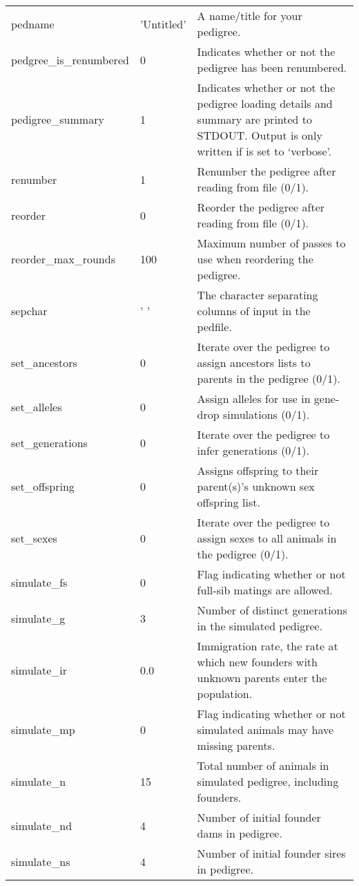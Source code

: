 \begin{center}
\begin{xtabular}{l|l|p{4in}}
	pedname          & 'Untitled'   & A name/title for your pedigree. \\
	pedgree\_is\_renumbered & 0     & Indicates whether or not the pedigree has been renumbered. \\
	pedigree\_summary & 1           & Indicates whether or not the pedigree loading details and summary are printed to STDOUT.  Output is only written if  is set to `verbose'. \\
	renumber         & 1            & Renumber the pedigree after reading from file (0/1). \\
	reorder 	 & 0		& Reorder the pedigree after reading from file (0/1). \\
	reorder\_max\_rounds & 100	& Maximum number of passes to use when reordering the pedigree. \\
	sepchar          & ' '          & The character separating columns of input in the pedfile. \\
	set\_ancestors   & 0            & Iterate over the pedigree to assign ancestors lists to parents in the pedigree (0/1). \\
	set\_alleles     & 0            & Assign alleles for use in gene-drop simulations (0/1). \\
	set\_generations & 0            & Iterate over the pedigree to infer generations (0/1). \\
	set\_offspring   & 0            & Assigns offspring to their parent(s)'s unknown sex offspring list. \\
	set\_sexes       & 0            & Iterate over the pedigree to assign sexes to all animals in the pedigree (0/1). \\
	simulate\_fs     & 0            & Flag indicating whether or not full-sib matings are allowed. \\
	simulate\_g      & 3            & Number of distinct generations in the simulated pedigree. \\
	simulate\_ir     & 0.0          & Immigration rate, the rate at which new founders with unknown parents enter the population. \\
	simulate\_mp     & 0            & Flag indicating whether or not simulated animals may have missing parents. \\
	simulate\_n      & 15           & Total number of animals in simulated pedigree, including founders. \\
	simulate\_nd     & 4            & Number of initial founder dams in pedigree. \\
	simulate\_ns     & 4            & Number of initial founder sires in pedigree. \\

\end{xtabular}
\end{center}
